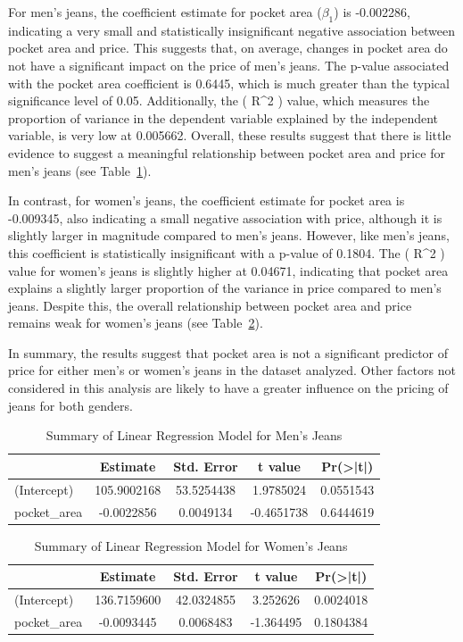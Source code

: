 \documentclass[
  letterpaper,
  DIV=11,
  numbers=noendperiod]{scrartcl}
\begin{document}
For men's jeans, the coefficient estimate for pocket area (\(\beta_1\))
is -0.002286, indicating a very small and statistically insignificant
negative association between pocket area and price. This suggests that,
on average, changes in pocket area do not have a significant impact on
the price of men's jeans. The p-value associated with the pocket area
coefficient is 0.6445, which is much greater than the typical
significance level of 0.05. Additionally, the ( R\^{}2 ) value, which
measures the proportion of variance in the dependent variable explained
by the independent variable, is very low at 0.005662. Overall, these
results suggest that there is little evidence to suggest a meaningful
relationship between pocket area and price for men's jeans (see
Table~\ref{tbl-men_lm}).

In contrast, for women's jeans, the coefficient estimate for pocket area
is -0.009345, also indicating a small negative association with price,
although it is slightly larger in magnitude compared to men's jeans.
However, like men's jeans, this coefficient is statistically
insignificant with a p-value of 0.1804. The ( R\^{}2 ) value for women's
jeans is slightly higher at 0.04671, indicating that pocket area
explains a slightly larger proportion of the variance in price compared
to men's jeans. Despite this, the overall relationship between pocket
area and price remains weak for women's jeans (see
Table~\ref{tbl-women_lm}).

In summary, the results suggest that pocket area is not a significant
predictor of price for either men's or women's jeans in the dataset
analyzed. Other factors not considered in this analysis are likely to
have a greater influence on the pricing of jeans for both genders.
\newpage

\hypertarget{tbl-men_lm}{}
\begin{table}
\caption{\label{tbl-men_lm}Summary of Linear Regression Model for Men's Jeans }\tabularnewline

\centering
\begin{tabular}{l|c|c|c|c}
\hline
  & Estimate & Std. Error & t value & Pr(>|t|)\\
\hline
(Intercept) & 105.9002168 & 53.5254438 & 1.9785024 & 0.0551543\\
\hline
pocket\_area & -0.0022856 & 0.0049134 & -0.4651738 & 0.6444619\\
\hline
\end{tabular}
\end{table}

\hypertarget{tbl-women_lm}{}
\begin{table}
\caption{\label{tbl-women_lm}Summary of Linear Regression Model for Women's Jeans }\tabularnewline

\centering
\begin{tabular}{l|c|c|c|c}
\hline
  & Estimate & Std. Error & t value & Pr(>|t|)\\
\hline
(Intercept) & 136.7159600 & 42.0324855 & 3.252626 & 0.0024018\\
\hline
pocket\_area & -0.0093445 & 0.0068483 & -1.364495 & 0.1804384\\
\hline
\end{tabular}
\end{table}
\end{document}

